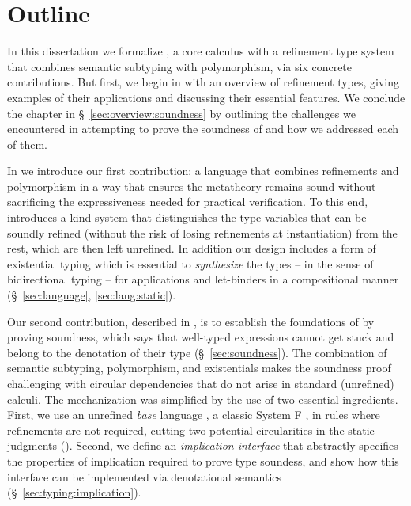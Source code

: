 \section{Outline}
\label{sec:outline}

In this dissertation we formalize \sysrf, a core calculus
with a refinement type system that combines semantic
subtyping with polymorphism, via six concrete contributions.
%
But first, we begin in  with an overview 
of refinement types, giving examples of their applications
and discussing their essential features. 
%
We conclude the
chapter in \S~\ref{sec:overview:soundness}          %
by outlining the challenges we encountered in attempting to
prove the soundness of \sysrf and how we addressed each of them.

%
In  we introduce            %
our first contribution: a language
that combines refinements and polymorphism
in a way that ensures the metatheory remains sound
without sacrificing the expressiveness needed
for practical verification.
%
To this end, \sysrf introduces a kind
system that distinguishes the type
variables that can be soundly refined
(without the risk of losing refinements
at instantiation) from the rest,
which are then left unrefined.
%
In addition our design includes
a form of existential typing \cite{Knowles09}
which is essential to \emph{synthesize} the types
-- in the sense of bidirectional typing -- for applications
and let-binders in a compositional manner 
(\S~\ref{sec:language}, \ref{sec:lang:static}).             %

%
Our second contribution,
described in ,
is to establish the foundations
of \sysrf by proving soundness,
which says that well-typed expressions cannot get stuck
and belong to the denotation of their type 
(\S~\ref{sec:soundness}).                                   %
%
%
The combination of semantic subtyping, polymorphism,
and existentials makes the soundness proof challenging
with circular dependencies that do not arise in standard
(unrefined) calculi.
%
The mechanization was simplified by the use of
two essential ingredients.
%
First, we use an unrefined \emph{base} language
\sysf, a classic System F \cite{TAPL}, in rules
where refinements are not required, cutting two potential
circularities in the static judgments ().
Second, we define an \emph{implication interface}
that abstractly specifies the properties of implication
required to prove type soundess, and show how this interface
can be implemented via denotational semantics 
(\S~\ref{sec:typing:implication}).                          %

